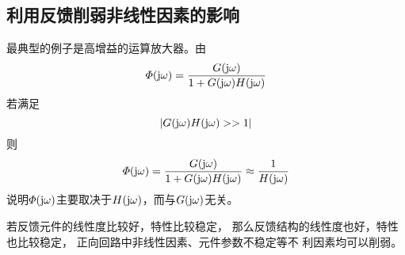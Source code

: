 \subsection{利用反馈削弱非线性因素的影响}
最典型的例子是高增益的运算放大器。由
\begin{equation}
	\varPhi(\text{j} \omega) = \dfrac{G(\text{j} \omega)}{1 + G(\text{j} \omega) H(\text{j} \omega)}
\end{equation}
若满足
\begin{equation}
	|G(\text{j} \omega)H(\text{j} \omega) >> 1|
\end{equation}
则
\begin{equation}
	\varPhi(\text{j} \omega) = \dfrac{G(\text{j} \omega)}{1 + G(\text{j} \omega)H(\text{j} \omega)} \approx \dfrac{1}{H(\text{j} \omega)}
\end{equation}
说明$\varPhi(\text{j} \omega)$主要取决于$H(\text{j} \omega)$，而与$G(\text{j} \omega)$无关。

若反馈元件的线性度比较好，特性比较稳定，
那么反馈结构的线性度也好，特性也比较稳定，
正向回路中非线性因素、元件参数不稳定等不
利因素均可以削弱。
\vspace*{1em}

